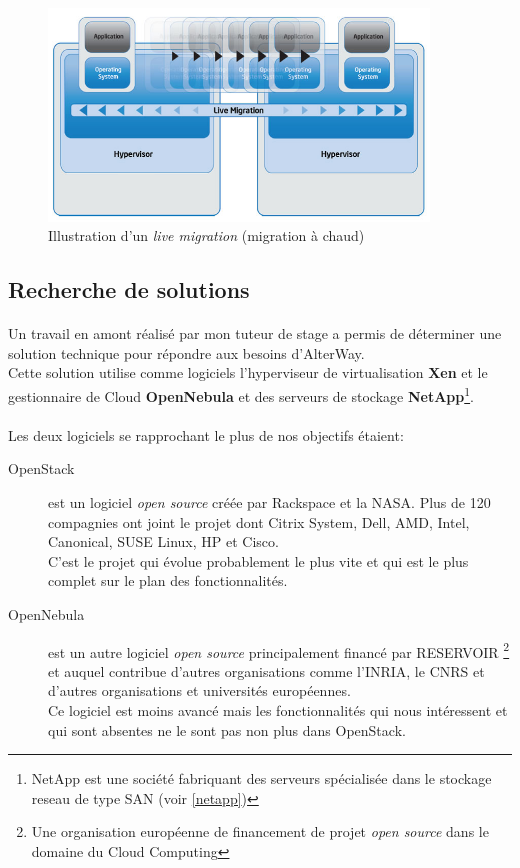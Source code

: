 \begin{figure}[h]
\centering
\includegraphics[width=0.9\textwidth]{resource/img/live-migration}
\caption{Illustration d'un \emph{live migration} (migration à chaud)}
\label{livemigration}
\end{figure}

\subsection{Recherche de solutions}
\paragraph*{}
Un travail en amont réalisé par mon tuteur de stage a permis de déterminer une solution technique pour répondre aux besoins d'AlterWay.\\
Cette solution utilise comme logiciels l'hyperviseur de virtualisation \textbf{Xen} et le gestionnaire de Cloud \textbf{OpenNebula} et des
serveurs de stockage \textbf{NetApp}\footnote{NetApp est une société fabriquant des serveurs spécialisée dans le stockage reseau de type SAN (voir \ref{netapp})}.


\paragraph*{}
Les deux logiciels se rapprochant le plus de nos objectifs étaient:
\begin{description}
	\item[OpenStack]  est un logiciel \emph{open source} créée par Rackspace et la NASA. Plus de 120 compagnies ont joint le projet dont Citrix System, Dell, AMD, Intel,
		Canonical, SUSE Linux, HP et Cisco.\\
		C'est le projet qui évolue probablement le plus vite et qui est le plus complet sur le plan des fonctionnalités.
	\item[OpenNebula]  est un autre logiciel \emph{open source} principalement financé par RESERVOIR
	\footnote{Une organisation européenne de financement de projet \emph{open source} dans le domaine du Cloud Computing} et auquel contribue d'autres organisations
	comme l'INRIA, le CNRS et d'autres organisations et universités européennes.\\
	Ce logiciel est moins avancé mais les fonctionnalités qui nous intéressent et qui sont absentes ne le sont pas non plus dans OpenStack.
\end{description}


